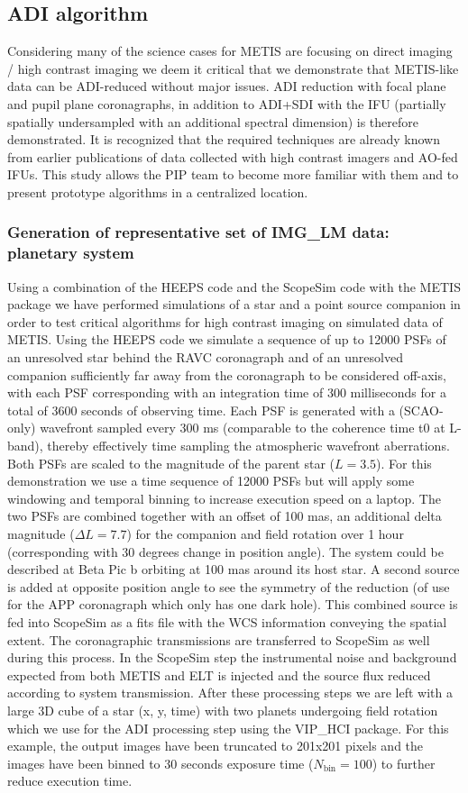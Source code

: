 \subsection{ADI algorithm}\label{ssec:criticaladialgorithm}
Considering many of the science cases for METIS are focusing on direct imaging / high contrast imaging we deem it critical that we demonstrate that METIS-like data can be ADI-reduced without major issues.
ADI reduction with focal plane and pupil plane coronagraphs, in addition to ADI+SDI with the IFU (partially spatially undersampled with an additional spectral dimension) is therefore demonstrated.
It is recognized that the required techniques are already known from earlier publications of data collected with high contrast imagers and AO-fed IFUs.
This study allows the PIP team to become more familiar with them and to present prototype algorithms in a centralized location.

\subsubsection{Generation of representative set of IMG\_LM data: planetary system}
Using a combination of the HEEPS code and the ScopeSim code with the METIS package we have performed simulations of a star and a point source companion in order to test critical algorithms for high contrast imaging on simulated data of METIS.
Using the HEEPS code we simulate a sequence of up to 12000 PSFs of an unresolved star behind the RAVC coronagraph and of an unresolved companion sufficiently far away from the coronagraph to be considered off-axis, with each PSF corresponding with an integration time of 300 milliseconds for a total of 3600 seconds of observing time. Each PSF is generated with a (SCAO-only) wavefront sampled every 300 ms (comparable to the coherence time t0 at L-band), thereby effectively time sampling the atmospheric wavefront aberrations. Both PSFs are scaled to the magnitude of the parent star ($L=3.5$). For this demonstration we use a time sequence of 12000 PSFs but will apply some windowing and temporal binning to increase execution speed on a laptop. 
The two PSFs are combined together with an offset of 100 mas, an additional delta magnitude ($\Delta L=7.7$) for the companion and field rotation over 1 hour (corresponding with 30 degrees change in position angle). The system could be described at Beta Pic b orbiting at 100 mas around its host star. A second source is added at opposite position angle to see the symmetry of the reduction (of use for the APP coronagraph which only has one dark hole). This combined source is fed into ScopeSim as a fits file with the WCS information conveying the spatial extent. The coronagraphic transmissions are transferred to ScopeSim as well during this process.
In the ScopeSim step the instrumental noise and background expected from both METIS and ELT is injected and the source flux reduced according to system transmission. 
After these processing steps we are left with a large 3D cube of a star (x, y, time) with two planets undergoing field rotation which we use for the ADI processing step using the VIP\_HCI package. For this example, the output images have been truncated to 201x201 pixels and the images have been binned to 30 seconds exposure time ($N_\mathrm{bin}=100$) to further reduce execution time.

